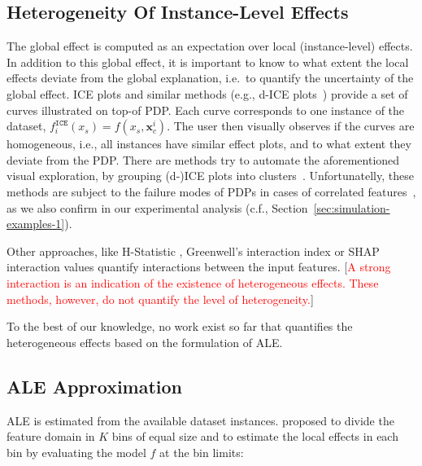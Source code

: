 \documentclass[twoside]{article}
\newcommand{\xc}{\mathbf{x}_c}
\newcommand{\todo}[1]{[\textcolor{red}{#1}]}
\begin{document}
\subsection{Heterogeneity Of Instance-Level Effects}
\label{sec:quant-heter-effects}

The global effect is computed as an expectation over local
(instance-level) effects. In addition to this global effect, it is
important to know to what extent the local effects deviate from the
global explanation, i.e.~to quantify the uncertainty of the global
effect. ICE plots and similar methods (e.g., d-ICE
plots~\citep{goldstein2015peeking}) provide a set of curves
illustrated on top-of PDP. Each curve corresponds to one instance of
the dataset, \(f^{\mathtt{ICE}}_i(x_s) = f(x_s, \xc^i)\). The user
then visually observes if the curves are homogeneous, i.e., all
instances have similar effect plots, and to what extent they deviate
from the PDP. There are methods try to automate the aforementioned
visual exploration, by grouping (d-)ICE plots into
clusters~\citep{molnar2020model, herbinger2022repid,
  britton2019vine}. Unfortunatelly, these methods are subject to the
failure modes of PDPs in cases of correlated
features~\citep{baniecki2021fooling}, as we also confirm in our
experimental analysis (c.f., Section~\ref{sec:simulation-examples-1}).

Other approaches, like H-Statistic \citep{friedman2008predictive},
Greenwell's interaction index \citep{greenwell2018simple} or SHAP
interaction values \citep{lundberg2018consistent} quantify
interactions between the input features. \todo{A strong interaction is
  an indication of the existence of heterogeneous effects. These
  methods, however, do not quantify the level of heterogeneity.}

To the best of our knowledge, no work exist so far that quantifies the
heterogeneous effects based on the formulation of ALE.

\subsection{ALE Approximation}
\label{sec:ale-approximation}

ALE is estimated from the available dataset
instances. \citep{apley2020visualizing} proposed to divide the feature
domain in \(K\) bins of equal size and to estimate the local effects
in each bin by evaluating the model \(f\) at the bin limits:
\end{document}
